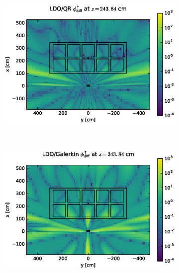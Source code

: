 \clearpage
\begin{figure}[!htb]
\begin{subfigure}{\textwidth}
\centering
\includegraphics[max height=0.445\textheight]
{img/cargo-plots/fwc-adj/flux-diff-rel-qr04.eps}
\end{subfigure}
\\
\begin{subfigure}{\textwidth}
\centering
\includegraphics[max height=0.445\textheight]
{img/cargo-plots/fwc-adj/flux-diff-rel-gkn04.eps}
\end{subfigure}
\end{figure}
\clearpage
